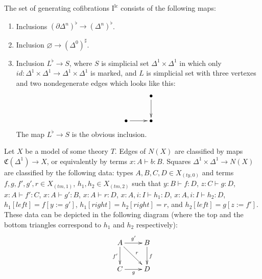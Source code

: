 \documentclass[reqno]{amsart}
\theoremstyle{definition}
\theoremstyle{remark}
\newcommand{\repl}{:=}
\newcommand{\lc}{lc}
\newcommand{\mlc}{\mathrm{\lc}}
\newcommand{\lcI}{\I^\mlc}
\newcommand{\I}{\mathrm{I}}
\numberwithin{figure}{section}
\begin{document}
The set of generating cofibrations $\lcI$ consists of the following maps:
\begin{enumerate}
\item Inclusions $(\partial \Delta^n)^\flat \to (\Delta^n)^\flat$.
\item Inclusion $\varnothing \to (\Delta^0)^\sharp$.
\item Inclusion $L^\flat \to S$, where $S$ is simplicial set $\Delta^1 \times \Delta^1$ in which only $id : \Delta^1 \times \Delta^1 \to \Delta^1 \times \Delta^1$ is marked,
and $L$ is simplicial set with three vertexes and two nondegenerate edges which looks like this:
\[ \xymatrix{                & \bullet \ar[d] \\
              \bullet \ar[r] & \bullet
            } \]
The map $L^\flat \to S$ is the obvious inclusion.
\end{enumerate}

\begin{comment}
\begin{prop}
A map $f : X \to Y$ of \lc-marked simplicial sets is a cofibration if and only if the following conditions hold:
\begin{enumerate}
\item $f$ is a monomorphism of simplicial sets.
\item For every vertex or square $x$ of $X$, if $f(x)$ is marked in $Y$, then $x$ is marked in $X$.
\item For every marked square of $Y$ which does not belong to $X$, every nondegenerate simplex of $\Delta^1 \times \Delta^1$,
which is degenerate in $Y$, belongs to $L^\flat$.
\item For every distinct marked squares $y_1$ and $y_2$ of $Y$ at least one of which does not belong to $X$,
every common simplex of $y_1$ and $y_2$ belongs to $L^\flat$.
\end{enumerate}
\end{prop}
\end{comment}

Let $X$ be a model of some theory $T$.
Edges of $N(X)$ are classified by maps $\mathfrak{C}(\Delta^1) \to X$, or equivalently by terms $x : A \vdash b : B$.
Squares $\Delta^1 \times \Delta^1 \to N(X)$ are classified by the following data:
types $A,B,C,D \in X_{(ty,0)}$ and terms $f,g,f',g',r \in X_{(tm,1)}$, $h_1,h_2 \in X_{(tm,2)}$ such that $y : B \vdash f : D$, $z : C \vdash g : D$, $x : A \vdash f' : C$, $x : A \vdash g' : B$, $x : A \vdash r : D$,
$x : A, i : I \vdash h_1 : D$, $x : A, i : I \vdash h_2 : D$, $h_1[left] = f[y \repl g']$, $h_1[right] = h_2[right] = r$, and $h_2[left] = g[z \repl f']$.
These data can be depicted in the following diagram (where the top and the bottom triangles correspond to $h_1$ and $h_2$ respectively):
\[ \xymatrix{ A \ar[r]^{g'} \ar[d]_{f'} \ar[rd]^r & B \ar[d]^f \\
              C \ar[r]_g & D
            } \]
\end{document}
